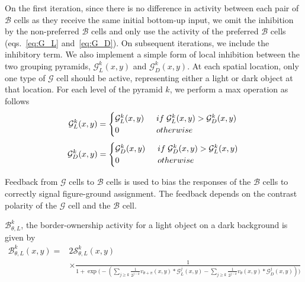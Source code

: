 On the first iteration, since there is no difference in activity between each pair of $\mathcal{B}$ cells as they receive the same initial bottom-up input, we omit the inhibition by the non-preferred
$\mathcal{B}$ cells and only use the activity of the preferred
$\mathcal{B}$ cells (eqs.~\ref{eq:G_L} and~\ref{eq:G_D}). On subsequent iterations, we include the inhibitory term. We also implement a simple form of local inhibition between the two grouping pyramids, $\mathcal{G}^k_{L}(x,y)$ and $\mathcal{G}^k_{D}(x,y)$. At each spatial location, only one type of $\mathcal{G}$ cell should be active, representing either a light or dark object at that location. For each level of the pyramid $k$, we perform a max operation as follows
\begin{equation}
	\mathcal{G}^k_{L}(x,y)=
	\begin{cases}
	\mathcal{G}^k_{L}(x,y) \:\;&if\;\mathcal{G}^k_{L}(x,y) > \mathcal{G}^k_{D}(x,y)\\
	0\;&otherwise
	\end{cases}\\
\end{equation}
\begin{equation}
	\mathcal{G}^k_{D}(x,y)=
	\begin{cases}
	\mathcal{G}^k_{D}(x,y) \:\;&if\;\mathcal{G}^k_{D}(x,y) > \mathcal{G}^k_{L}(x,y)\\
	0\;&otherwise
	\end{cases}\\
\end{equation}

Feedback from $\mathcal{G}$ cells to $\mathcal{B}$ cells is used to bias the responses of the $\mathcal{B}$ cells to correctly signal figure-ground assignment. The feedback depends on the contrast polarity of the $\mathcal{G}$ cell and the $\mathcal{B}$ cell.

$\mathcal{B}^k_{\theta,L}$, the border-ownership activity for a light object on a dark background is given by
\begin{equation}
\begin{split}
\mathcal{B}^k_{\theta,L}(x,y) = &2\mathcal{S}^k_{\theta,L}(x,y)\\
            &\times\frac{1}{1+\exp\Big(-(\sum_{j\geq k}\frac{1}{2^{j-k}} v_{\theta+\pi}(x,y) \ast \mathcal{G}^j_{L}(x,y)-\sum_{j\geq k}\frac{1}{2^{j-k}} v_{\theta}(x,y) \ast \mathcal{G}^j_{D}(x,y))\Big)}
\end{split}
\label{eq:border-orientation1}
\end{equation}

